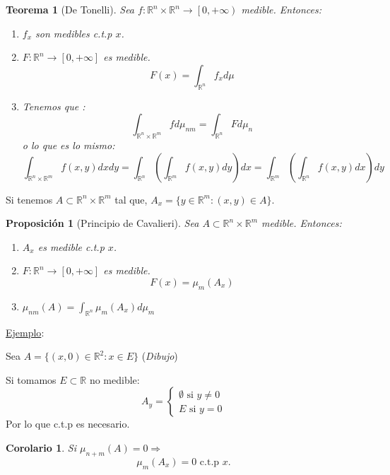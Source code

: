 \documentclass[10pt,a4paper,openright]{book}
\theoremstyle{break}
\newtheorem*{theo}{Teorema}
\newtheorem*{coro}{Corolario}
\newtheorem*{prop}{Proposición}
\newcommand{\dif}[1]{ d#1}
\begin{document}
\begin{theo}[De Tonelli]
Sea $f: \mathbb{R}^{n} \times \mathbb{R}^n \rightarrow \left[0, +\infty\right)$ medible. Entonces: 
\begin{enumerate}
    \item $f_x$ son medibles c.t.p $x$.
    \item $F: \mathbb{R}^{n} \rightarrow \left[0, +\infty\right]$ es medible.
        $$F \left(x\right) = \int_{\mathbb{R}^n} f_x \dif{\mu} $$
    \item Tenemos que :
        $$\int_{\mathbb{R}^n \times \mathbb{R}^m} f \dif{\mu_{nm}} = \int_{\mathbb{R}^n} F \dif{\mu_n} $$
    o lo que es lo mismo: 
    $$\int_{\mathbb{R}^n \times \mathbb{R}^m} f \left(x, y\right) \dif{x}\dif{y} =     \int_{\mathbb{R}^n}\left(\int_{\mathbb{R}^m} f \left(x, y\right) \dif{y} \right)\dif{x} = \int_{\mathbb{R}^m}\left(\int_{\mathbb{R}^n} f \left(x, y\right) \dif{x} \right)\dif{y}$$
\end{enumerate}
\end{theo}

Si tenemos $A \subset \mathbb{R}^n \times \mathbb{R}^m$ tal que, $A_x = \{y \in \mathbb{R}^m: \left(x, y\right) \in A\}$.
\begin{prop}[Principio de Cavalieri]
Sea $A \subset \mathbb{R}^n \times \mathbb{R}^m$ medible. Entonces: 
\begin{enumerate}
    \item $A_x$ es medible c.t.p $x$.
    \item $F: \mathbb{R}^n \rightarrow \left[0, +\infty\right]$ es medible. 
    $$F \left(x\right) = \mu_m \left(A_x\right)$$
    \item $\mu_{n m} \left(A\right) = \int_{\mathbb{R}^n} \mu_m \left(A_x\right) \dif{\mu_m} $
\end{enumerate}
\end{prop}

\underline{Ejemplo}:

Sea $A = \{ \left(x, 0\right) \in \mathbb{R}^2: x \in E\}$
(\textit{Dibujo})

Si tomamos $E \subset \mathbb{R}$ no medible: 
$$A_y = \begin{cases}
    \emptyset \text{ si } y \neq 0\\
    E \text{ si } y = 0
\end{cases}$$
Por lo que c.t.p es necesario.

\begin{coro}
Si $\mu_{n + m} \left(A\right) = 0 \Rightarrow$ 
$$\mu_m \left(A_x\right) = 0 \text{ c.t.p } x.$$
\end{coro}
\end{document}
